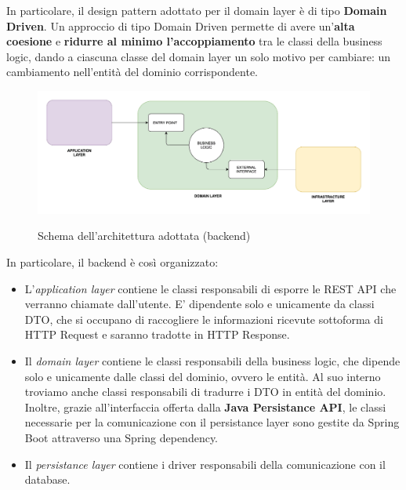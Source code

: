             In particolare, il design pattern adottato per il domain layer è di tipo \textbf{Domain Driven}. Un approccio di tipo Domain Driven permette di avere un'\textbf{alta coesione} e \textbf{ridurre al minimo l'accoppiamento} tra le classi della business logic, dando a ciascuna classe del domain layer un solo motivo per cambiare: un cambiamento nell'entità del dominio corrispondente.
            \begin{figure}[htbp!]
                \centering
                \includegraphics[width=0.8\linewidth]{Immagini/Object Design/DDD-Layers.jpg}
                \caption{Schema dell'architettura adottata (backend)}
                \cite{Baeldung1}
            \end{figure}

            In particolare, il backend è così organizzato:
            \begin{itemize}
                \item L'\textit{application layer} contiene le classi responsabili di esporre le REST API che verranno chiamate dall'utente. E' dipendente solo e unicamente da classi DTO, che si occupano di raccogliere le informazioni ricevute sottoforma di HTTP Request e saranno tradotte in HTTP Response. \cite{Baeldung2}
                \item Il \textit{domain layer} contiene le classi responsabili della business logic, che dipende solo e unicamente dalle classi del dominio, ovvero le entità. Al suo interno troviamo anche classi responsabili di tradurre i DTO in entità del dominio. \\
                Inoltre, grazie all'interfaccia offerta dalla \textbf{Java Persistance API}, le classi necessarie per la comunicazione con il persistance layer sono gestite da Spring Boot attraverso una Spring dependency.
                \item Il \textit{persistance layer} contiene i driver responsabili della comunicazione con il database.
            \end{itemize}

    \clearpage

